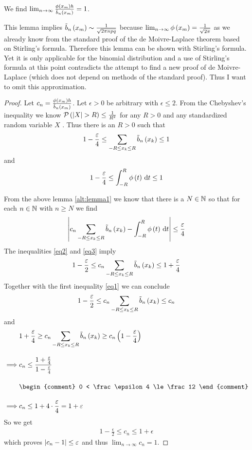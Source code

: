 \begin{lemma}
  We find $\lim_{n\to\infty} \frac{\fphi{\xnp}h}{\bnp} = 1$.
\end{lemma}

\begin{remark}
  This lemma implies $\bnp \sim \frac{1}{\sqrt{2\pi npq}}$ because $\lim_{n\to\infty} \fphi{\xnp} = \frac1{\sqrt{2\pi}}$ as we already know from the standard proof of the de Moivre-Laplace theorem based on Stirling's formula. Therefore this lemma can be shown with Stirling's formula. Yet it is only applicable for the binomial distribution and a use of Stirling's formula at this point contradicts the attempt to find a new proof of de Moivre-Laplace (which does not depend on methods of the standard proof). Thus I want to omit this approximation.
\end{remark}

\begin{proof}
  Let $c_n = \frac{\fphi{\xnp}h}{\bnp}$. Let $\epsilon > 0$ be arbitrary with $\epsilon \le 2$. From the Chebyshev's inequality we know $\P{\abs{X}> R} \le \frac{1}{R^2}$ for any $R > 0$ and any standardized random variable $X$ \cite{wiki:chebyshev}. Thus there is an $R >0$ such that
  \begin{align}\label{eq1}
    1 -\frac{\epsilon}4 \le \sum_{-R \le \x \le R} \bb{\x[k]} \le 1
  \end{align}
  and
  \begin{align}\label{eq2}
    1-\frac{\epsilon}4 \le \int_{-R}^R \fphi{t}\d{t} \le 1
  \end{align}

  From the above lemma \ref{alt:lemma1} we know that there is a $N\in\N$ so that for each $n\in\N$ with $n\ge N$ we find
  \begin{align} \label{eq3}
    \abs{c_n \sum_{-R\le\x\le R}\bb{\x} - \int_{-R}^R \fphi{t}\d{t}} \le \frac{\epsilon}4
  \end{align}
  The inequalities \eqref{eq2} and \eqref{eq3} imply
  \begin{align}
    1-\frac{\epsilon}2 \le c_n \sum_{-R \le \x \le R} \bb{\x} \le 1+\frac{\epsilon}4
  \end{align}
  Together with the first inequality \eqref{eq1} we can conclude
  \begin{align}
    1-\frac \epsilon2 \le c_n \sum_{-R \le \x \le R} \bb{\x} \le c_n
  \end{align}
  and
  \begin{align}
    & 1+\frac \epsilon4 \ge c_n \sum_{-R \le \x \le R} \bb{\x} \ge c_n \br{1-\frac \epsilon4} \bnl
    \implies & c_n \le \frac{1+\frac \epsilon4}{1-\frac\epsilon4} \bnl
    &
    \begin{comment}
      0 < \frac \epsilon 4 \le \frac 12
    \end{comment} \bnl
    \implies & c_n \le 1+4\cdot \frac \epsilon 4 = 1+\epsilon
  \end{align}
  So we get
  \begin{align}
    1-\frac \epsilon 2 \le c_n \le 1+\epsilon
  \end{align}
  which proves $\abs{c_n-1} \le \epsilon$ and thus $\lim_{n\to\infty} c_n = 1$.
\end{proof}

